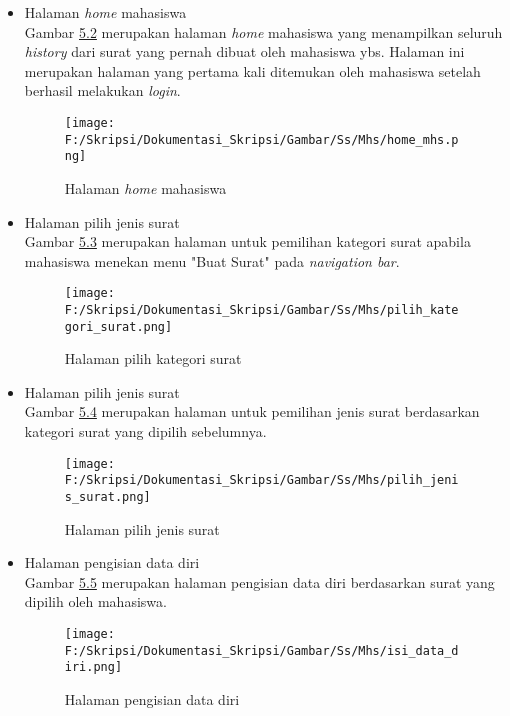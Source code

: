 \begin{itemize}
	\item Halaman \textit{home} mahasiswa\\
	 Gambar \hyperlink{halaman_home_mahasiswa}{5.2} merupakan halaman \textit{home} mahasiswa yang menampilkan seluruh \textit{history} dari surat yang pernah dibuat oleh mahasiswa ybs. Halaman ini merupakan halaman yang pertama kali ditemukan oleh mahasiswa setelah berhasil melakukan \textit{login}.
	 \begin{figure}[H]
	\centering
		\texttt{[image: F:/Skripsi/Dokumentasi\_Skripsi/Gambar/Ss/Mhs/home\_mhs.png]}
		\caption{Halaman \textit{home} mahasiswa}
		\label{fig:halaman_home_mahasiswa}
	\end{figure}
	
	\item Halaman pilih jenis surat\\
	Gambar \hyperlink{halaman_pilih_kategori_surat}{5.3} merupakan halaman untuk pemilihan kategori surat apabila mahasiswa menekan menu "Buat Surat" pada \textit{navigation bar}.
	\begin{figure}[H]
	\centering
		\texttt{[image: F:/Skripsi/Dokumentasi\_Skripsi/Gambar/Ss/Mhs/pilih\_kategori\_surat.png]}
		\caption{Halaman pilih kategori surat}
		\label{fig:halaman_pilih_kategori_surat}
	\end{figure}
	
	 \item Halaman pilih jenis surat\\
	Gambar \hyperlink{halaman_pilih_jenis_surat}{5.4} merupakan halaman untuk pemilihan jenis surat berdasarkan kategori surat yang dipilih sebelumnya.
	\begin{figure}[H]
	\centering
		\texttt{[image: F:/Skripsi/Dokumentasi\_Skripsi/Gambar/Ss/Mhs/pilih\_jenis\_surat.png]}
		\caption{Halaman pilih jenis surat}
		\label{fig:halaman_pilih_jenis_surat}
	\end{figure}
	
	\item Halaman pengisian data diri\\
	Gambar \hyperlink{halaman_pengisian_data_diri}{5.5} merupakan halaman pengisian data diri berdasarkan surat yang dipilih oleh mahasiswa.
	\begin{figure}[H]
	\centering
		\texttt{[image: F:/Skripsi/Dokumentasi\_Skripsi/Gambar/Ss/Mhs/isi\_data\_diri.png]}
		\caption{Halaman pengisian data diri}
		\label{fig:halaman_pengisian_data_diri}
	\end{figure}
	

\end{itemize}
